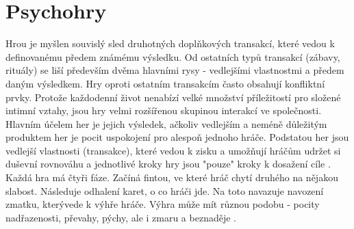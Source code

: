 \chapter{Psychohry}

Hrou je myšlen souvislý sled druhotných doplňkových transakcí, které vedou k definovanému předem známému výsledku. 
Od ostatních typů transakcí (zábavy, rituály) se liší především dvěma hlavními rysy - vedlejšími vlastnostmi a předem daným výsledkem. 
Hry oproti ostatním transakcím často obsahují konfliktní prvky.
Protože každodenní život nenabízí velké množství příležitostí pro složené intimní vztahy, jsou hry velmi rozšířenou skupinou interakcí ve společnosti.
Hlavním účelem her je jejich výsledek, ačkoliv vedlejším a neméně důležitým produktem her je pocit uspokojení pro alespoň jednoho hráče.
Podstatou her jsou  vedlejší vlastnosti (transakce), které vedou k zisku a umožňují hráčům udržet si duševní rovnováhu a jednotlivé kroky hry jsou "pouze" kroky k dosažení cíle \cite{jak_si_lide_hraji}.\\

Každá hra má čtyři fáze. Začíná fintou, ve které hráč chytí druhého na nějakou slabost. 
Následuje odhalení karet, o co hráči jde. 
Na toto navazuje navození zmatku, kterývede k výhře hráče. 
Výhra může mít různou podobu - pocity nadřazenosti, převahy, pýchy, ale i zmaru a beznaděje \cite{translacni_analyza_prirucka}.\\

